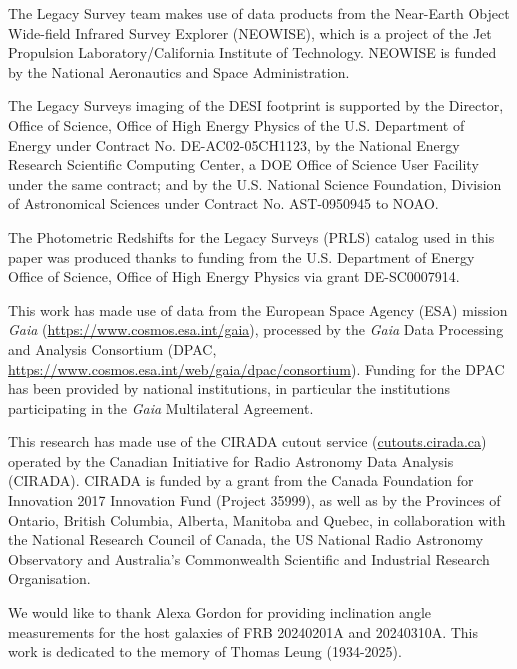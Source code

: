 \documentclass[twocolumn,linenumbers]{aastex631}
\newcommand{\dmh}{\ensuremath{{\rm DM}_\textrm{host}}}
\begin{document}
The Legacy Survey team makes use of data products from the Near-Earth Object Wide-field Infrared Survey Explorer (NEOWISE), which is a project of the Jet Propulsion Laboratory/California Institute of Technology. NEOWISE is funded by the National Aeronautics and Space Administration.

The Legacy Surveys imaging of the DESI footprint is supported by the Director, Office of Science, Office of High Energy Physics of the U.S. Department of Energy under Contract No. DE-AC02-05CH1123, by the National Energy Research Scientific Computing Center, a DOE Office of Science User Facility under the same contract; and by the U.S. National Science Foundation, Division of Astronomical Sciences under Contract No. AST-0950945 to NOAO.

The Photometric Redshifts for the Legacy Surveys (PRLS) catalog used in this paper was produced thanks to funding from the U.S. Department of Energy Office of Science, Office of High Energy Physics via grant DE-SC0007914.

This work has made use of data from the European Space Agency (ESA) mission
{\it Gaia} (\url{https://www.cosmos.esa.int/gaia}), processed by the {\it Gaia}
Data Processing and Analysis Consortium (DPAC,
\url{https://www.cosmos.esa.int/web/gaia/dpac/consortium}). Funding for the DPAC
has been provided by national institutions, in particular the institutions
participating in the {\it Gaia} Multilateral Agreement.

This research has made use of the CIRADA cutout service (\url{cutouts.cirada.ca}) operated by the Canadian Initiative for Radio Astronomy Data Analysis (CIRADA). CIRADA is funded by a grant from the Canada Foundation for Innovation 2017 Innovation Fund (Project 35999), as well as by the Provinces of Ontario, British Columbia, Alberta, Manitoba and Quebec, in collaboration with the National Research Council of Canada, the US National Radio Astronomy Observatory and Australia’s Commonwealth Scientific and Industrial Research Organisation. 

We would like to thank Alexa Gordon for providing inclination angle measurements for the host galaxies of FRB 20240201A and 20240310A. This work is dedicated to the memory of Thomas Leung (1934-2025).

\vspace{5mm}


\end{document}

